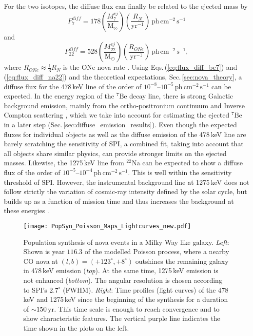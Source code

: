 \documentclass{aa}
\newcommand{\mrm}[1]{\mathrm{#1}}
\newcommand{\nuc}[2]{$\mrm{^{#2}#1}$}
\begin{document}
%
For the two isotopes, the diffuse flux can finally be related to the ejected mass by
%
\begin{equation}
	F_7^{diff} = 178 \left(\frac{M_7^{ej}}{\mrm{M_{\odot}}}\right) \left(\frac{R_N}{\mrm{yr^{-1}}}\right)\,\mrm{ph\,cm^{-2}\,s^{-1}}
	\label{eq:flux_diff_be7}
\end{equation}
%
and
%
\begin{equation}
F_{22}^{diff} = 528 \left(\frac{M_{22}^{ej}}{\mrm{M_{\odot}}}\right) \left(\frac{R_{ONe}}{\mrm{yr^{-1}}}\right)\,\mrm{ph\,cm^{-2}\,s^{-1}}\mrm{,}
\label{eq:flux_diff_na22}
\end{equation}
%
where $R_{ONe} \approx \frac{1}{3} R_N$ is the ONe nova rate \citep{Gil-Pons2003_novae}.
%
Using Eqs.\,(\ref{eq:flux_diff_be7}) and (\ref{eq:flux_diff_na22}) and the theoretical expectations, Sec.\,\ref{sec:nova_theory}, a diffuse flux for the 478\,keV line of the order of $10^{-8}$--$10^{-5}\,\mrm{ph\,cm^{-2}\,s^{-1}}$ can be expected.
%
In the energy region of the \nuc{Be}{7} decay line, there is strong Galactic background emission, mainly from the ortho-positronium continuum and Inverse Compton scattering \citep[e.g.,][]{Churazov2005_511,Churazov2011_511,Jean2006_511,Bouchet2010_511,Siegert2016_511,Siegert2019_lv511}, which we take into account for estimating the ejected \nuc{Be}{7} in a later step (Sec.\,\ref{sec:diffuse_emission_results}).
%
Even though the expected fluxes for individual objects as well as the diffuse emission of the 478\,keV line are barely scratching the sensitivity of SPI, a combined fit, taking into account that all objects share similar physics, can provide stronger limits on the ejected masses.
%
Likewise, the 1275\,keV line from \nuc{Na}{22} can be expected to show a diffuse flux of the order of $10^{-5}$--$10^{-4}\,\mrm{ph\,cm^{-2}\,s^{-1}}$.
%
This is well within the sensitivity threshold of SPI.
%
However, the instrumental background line at 1275\,keV does not follow strictly the variation of cosmic-ray intensity defined by the solar cycle, but builds up as a function of mission time and thus increases the background at these energies \citep{Diehl2018_BGRDB}.

\begin{figure*}[!ht]
	\centering
	\texttt{[image: PopSyn\_Poisson\_Maps\_Lightcurves\_new.pdf]}
	\caption{Population synthesis of nova events in a Milky Way like galaxy. \textit{Left}: Shown is year $116.3$ of the modelled Poisson process, where a nearby CO nova at $(l,b) = (+123^{\circ},+8^{\circ})$ outshines the remaining galaxy in 478\,keV emission (\textit{top}). At the same time, 1275\,keV emission is not enhanced (\textit{bottom}). The angular resolution is chosen according to SPI's $2.7^{\circ}$ (FWHM). \textit{Right}: Time profiles (light curves) of the 478\,keV and 1275\,keV since the beginning of the synthesis for a duration of $\sim 150\,\mrm{yr}$. This time scale is enough to reach convergence and to show characteristic features. The vertical purple line indicates the time shown in the plots on the left.}
	\label{fig:time_profile_lines}
\end{figure*}
\end{document}

